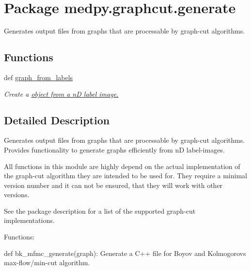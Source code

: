 \hypertarget{namespacemedpy_1_1graphcut_1_1generate}{
\section{Package medpy.graphcut.generate}
\label{namespacemedpy_1_1graphcut_1_1generate}
}


Generates output files from graphs that are processable by graph-\/cut algorithms.  


\subsection*{Functions}
\begin{DoxyCompactItemize}
\item 
def \hyperlink{namespacemedpy_1_1graphcut_1_1generate_a137ecdeeb31eb5be7bdcf70da1509477}{graph\_\-from\_\-labels}
\begin{DoxyCompactList}\small\item\em Create a \hyperlink{}{object from a nD label image. }\end{DoxyCompactList}\end{DoxyCompactItemize}


\subsection{Detailed Description}
Generates output files from graphs that are processable by graph-\/cut algorithms. Provides functionality to generate graphs efficiently from nD label-\/images.

All functions in this module are highly depend on the actual implementation of the graph-\/cut algorithm they are intended to be used for. They require a minimal version number and it can not be ensured, that they will work with other versions.

See the package description for a list of the supported graph-\/cut implementations.

Functions:
\begin{DoxyItemize}
\item def bk\_\-mfmc\_\-generate(graph): Generate a C++ file for Boyov and Kolmogorovs max-\/flow/min-\/cut algorithm.
\end{DoxyItemize}

